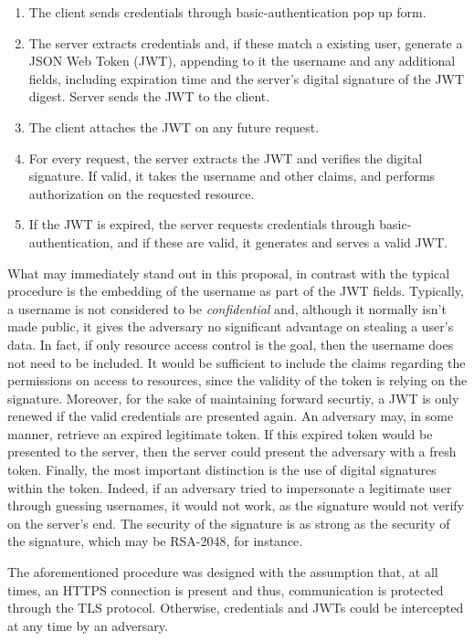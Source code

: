 \documentclass[12pt]{article}
\newcommand{\TODO}{\todo[inline]}
\begin{document}
\TODO{Structure as an algorithm}
\begin{enumerate}
\item The client sends credentials through basic-authentication pop up form.
\item The server extracts credentials and, if these match a existing user, generate a JSON Web Token (JWT), appending to it the username and any additional fields, including expiration time and the server's digital signature of the JWT digest. Server sends the JWT to the client.
\item The client attaches the JWT on any future request.
\item For every request, the server extracts the JWT and verifies the digital signature. If valid, it takes the username and other claims, and performs authorization on the requested resource.
\item If the JWT is expired, the server requests credentials through basic-authentication, and if these are valid, it generates and serves a valid JWT.
\end{enumerate}

What may immediately stand out in this proposal, in contrast with the typical procedure is the embedding of the username as part of the JWT fields. Typically, a username is not considered to be \emph{confidential} and, although it normally isn't made public, it gives the adversary no significant advantage on stealing a user's data. In fact, if only resource access control is the goal, then the username does not need to be included. It would be sufficient to include the claims regarding the permissions on access to resources, since the validity of the token is relying on the signature. Moreover, for the sake of maintaining forward securtiy, a JWT is only renewed if the valid credentials are presented again. An adversary may, in some manner, retrieve an expired legitimate token. If this expired token would be presented to the server, then the server could present the adversary with a fresh token. Finally, the most important distinction is the use of digital signatures within the token. Indeed, if an adversary tried to impersonate a legitimate user through guessing usernames, it would not work, as the signature would not verify on the server's end. The security of the signature is as strong as the security of the signature, which may be RSA-2048, for instance.

The aforementioned procedure was designed with the assumption that, at all times, an HTTPS connection is present and thus, communication is protected through the TLS protocol. Otherwise, credentials and JWTs could be intercepted at any time by an adversary. 
\end{document}
